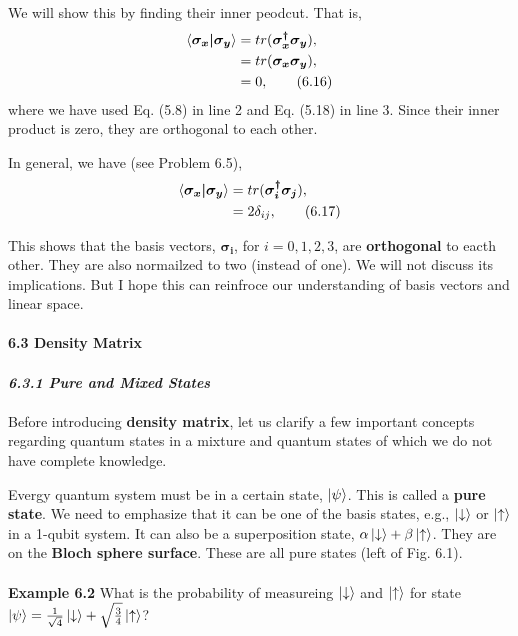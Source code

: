 \documentclass{article}
\newcommand{\bfit}[1]{\textit{\textbf{#1}}}
\begin{document}
We will show this by finding their inner peodcut. That is,
\begin{align*} \label{eq 6.16}
    \braket{\boldsymbol{\sigma_x|\sigma_y}}&=tr(\boldsymbol{\sigma_x^{\dagger}\sigma_y}),\\
    &=tr(\boldsymbol{\sigma_x\sigma_y}),\\
    &=0,\tag{6.16}
\end{align*} 
where we have used Eq. (5.8) in line 2 and Eq. (5.18) in line 3. Since their inner
product is zero, they are orthogonal to each other.

In general, we have (see Problem 6.5),
\begin{align*}
    \braket{\boldsymbol{\sigma_x|\sigma_y}}&=tr(\boldsymbol{\sigma_i^{\dagger}\sigma_j}),\\
    &= 2\delta_{ij}, \tag{6.17}
\end{align*}

This shows that the basis vectors, $\boldsymbol{\sigma_i}$, for $i=0,1,2,3$, are \textbf{orthogonal}
to eacth other. They are also normailzed to two (instead of one). We will not discuss its
implications. But I hope this can reinfroce our understanding of basis vectors and linear space.\\\\
\textbf{\large 6.3 Density Matrix}\\\\
\bfit{\large 6.3.1 Pure and Mixed States}\\\\
Before introducing \textbf{density matrix}, let us clarify a few important concepts regarding
quantum states in a mixture and quantum states of which we do not have complete knowledge.

Evergy quantum system must be in a certain state, $\ket{\psi}$. This is called
a \textbf{pure state}. We need to emphasize that it can be one of the basis states,
e.g., $\ket{\downarrow}$ or $\ket{\uparrow}$ in a 1-qubit system. It can also be a 
superposition state, $\alpha\ket{\downarrow}+\beta\ket{\uparrow}$. They are on the
\textbf{Bloch sphere surface}. These are all pure states (left of Fig. 6.1).\\\\
\textbf{Example 6.2} What is the probability of measureing $\ket{\downarrow}$ and $\ket{\uparrow}$ for state
$\ket{\psi}=\frac{1}{\sqrt{4}}\ket{\downarrow}+\sqrt{\frac{3}{4}}\ket{\uparrow}$?
\\\\
\end{document}
